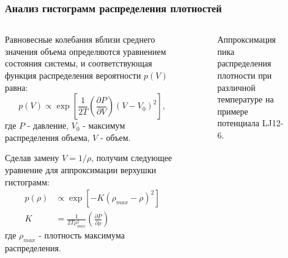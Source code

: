 \documentclass[pdf,hyperref={unicode}]{beamer}
\begin{document}
\begin{frame}
\transdissolve[duration=0.2]
\frametitle{Анализ гистограмм распределения плотностей}

\begin{columns}

\begin{column}{0.45\linewidth}
{\tiny{
Равновесные колебания вблизи среднего значения объема определяются уравнением состояния системы, и соответствующая функция распределения вероятности $p(V)$ равна:
\begin{equation}
p(V) \varpropto \exp\left[ \frac{1}{2T} \left( \frac{\partial P}{\partial V} \right)  \left(V - V_0 \right)^2 \right],
\label{eqPv}
\end{equation}
где $P$ - давление, $V_0$ - максимум распределения объема, $V$ - объем.

Сделав замену $V = 1 / \rho$, получим следующее уравнение для аппроксимации верхушки гистограмм:
\begin{equation}
\begin{aligned}
p(\rho) &\varpropto \exp \left[ - K \left(\rho_{max}- \rho \right)^2 \right] \\
K &= \frac{1}{2T\rho_{max}^2} \left( \frac{\partial P}{\partial \rho} \right)
\end{aligned}
\label{eqFitRho}
\end{equation}
где $\rho_{max}$ - плотность максимума распределения.
}}
\end{column}


\begin{column}{0.65\linewidth}
{
\begin{figure}[h]
\caption{\tiny Аппроксимация пика распределения плотности при различной
температуре на примере потенциала LJ12-6.}
\end{figure}
}
\end{column}

\end{columns}

\end{frame}
\end{document}
